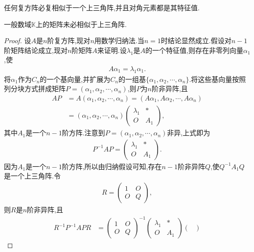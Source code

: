 \documentclass[../../main.tex]{subfiles}%
\begin{document}
\begin{theorem}[复方阵必相似于上三角阵]\label{theorem:复方阵必相似于上三角阵}
任何复方阵必复相似于一个上三角阵,并且对角元素都是其特征值.
\end{theorem}
\begin{remark}
一般数域$\mathbb{K}$上的矩阵未必相似于上三角阵.
\end{remark}
\begin{proof}
设$A$是$n$阶复方阵,现对$n$用数学归纳法.当$n=1$时结论显然成立.假设对$n-1$阶矩阵结论成立,现对$n$阶矩阵$A$来证明.设$\lambda_1$是$A$的一个特征值,则存在非零列向量$\alpha_1$,使
\begin{align*}
A \alpha_1 = \lambda_1 \alpha_1.
\end{align*}
将$\alpha_1$作为$C_n$的一个基向量,并扩展为$C_n$的一组基$\{\alpha_1, \alpha_2, \cdots, \alpha_n\}$.将这些基向量按照列分块方式拼成矩阵$P = (\alpha_1, \alpha_2, \cdots, \alpha_n)$,则$P$为$n$阶非异阵,且
\begin{align*}
AP &= A(\alpha_1, \alpha_2, \cdots, \alpha_n) = (A\alpha_1, A\alpha_2, \cdots, A\alpha_n) \\
&= (\alpha_1, \alpha_2, \cdots, \alpha_n) \begin{pmatrix}
\lambda_1 & * \\
O & A_1
\end{pmatrix},
\end{align*}
其中$A_1$是一个$n-1$阶方阵.注意到$P = (\alpha_1, \alpha_2, \cdots, \alpha_n)$非异,上式即为
\begin{align*}
P^{-1}AP = \begin{pmatrix}
\lambda_1 & * \\
O & A_1
\end{pmatrix}.
\end{align*}
因为$A_1$是一个$n-1$阶方阵,所以由归纳假设可知,存在$n-1$阶非异阵$Q$,使$Q^{-1}A_1Q$是一个上三角阵.令
\begin{align*}
R = \begin{pmatrix}
1 & O \\
O & Q
\end{pmatrix},
\end{align*}
则$R$是$n$阶非异阵,且
\begin{align*}
R^{-1}P^{-1}APR &= \begin{pmatrix}
1 & O \\
O & Q
\end{pmatrix}^{-1} \begin{pmatrix}
\lambda_1 & * \\
O & A_1
\end{pmatrix} \begin{pmatrix}

\end{pmatrix}
\end{align*}
\end{proof}
\end{document}
